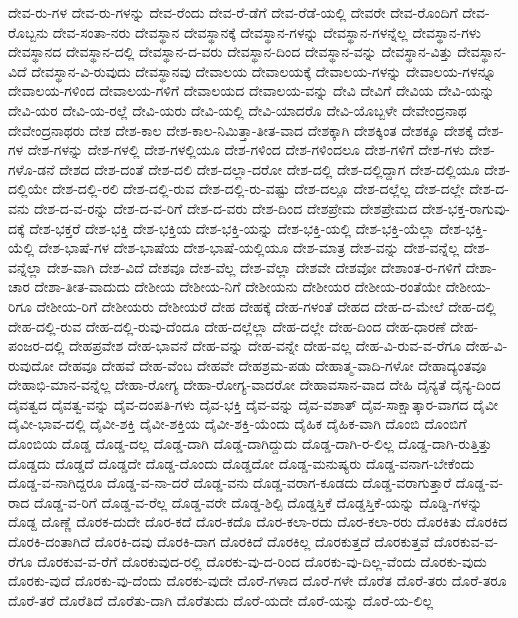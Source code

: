{ದೇವ-ರು-ಗಳ
ದೇವ-ರು-ಗಳನ್ನು
ದೇವ-ರೆಂದು
ದೇವ-ರೆ-ಡೆಗೆ
ದೇವ-ರೆಡೆ-ಯಲ್ಲಿ
ದೇವರೇ
ದೇವ-ರೊಂದಿಗೆ
ದೇವ-ರೊಬ್ಬನು
ದೇವ-ಸಂತಾ-ನರು
ದೇವಸ್ಥಾನ
ದೇವಸ್ಥಾನಕ್ಕೆ
ದೇವಸ್ಥಾನ-ಗಳನ್ನು
ದೇವಸ್ಥಾನ-ಗಳನ್ನೆಲ್ಲ
ದೇವಸ್ಥಾನ-ಗಳು
ದೇವಸ್ಥಾನದ
ದೇವಸ್ಥಾನ-ದಲ್ಲಿ
ದೇವಸ್ಥಾನ-ದ-ವರು
ದೇವಸ್ಥಾನ-ದಿಂದ
ದೇವಸ್ಥಾನ-ವನ್ನು
ದೇವಸ್ಥಾನ-ವಿತ್ತು
ದೇವಸ್ಥಾನ-ವಿದೆ
ದೇವಸ್ಥಾನ-ವಿ-ರುವುದು
ದೇವಸ್ಥಾನವು
ದೇವಾಲಯ
ದೇವಾಲಯಕ್ಕೆ
ದೇವಾಲಯ-ಗಳನ್ನು
ದೇವಾಲಯ-ಗಳನ್ನೂ
ದೇವಾಲಯ-ಗಳಿಂದ
ದೇವಾಲಯ-ಗಳಿಗೆ
ದೇವಾಲಯದ
ದೇವಾಲಯ-ವನ್ನು
ದೇವಿ
ದೇವಿಗೆ
ದೇವಿಯ
ದೇವಿ-ಯನ್ನು
ದೇವಿ-ಯರ
ದೇವಿ-ಯ-ರಲ್ಲೆ
ದೇವಿ-ಯರು
ದೇವಿ-ಯಲ್ಲಿ
ದೇವಿ-ಯಾದರೊ
ದೇವಿ-ಯೊಬ್ಬಳೇ
ದೇವೇಂದ್ರನಾಥ
ದೇವೇಂದ್ರನಾಥರು
ದೇಶ
ದೇಶ-ಕಾಲ
ದೇಶ-ಕಾಲ-ನಿಮಿತ್ತಾ-ತೀತ-ವಾದ
ದೇಶಕ್ಕಾಗಿ
ದೇಶಕ್ಕಿಂತ
ದೇಶಕ್ಕೂ
ದೇಶಕ್ಕೆ
ದೇಶ-ಗಳ
ದೇಶ-ಗಳನ್ನು
ದೇಶ-ಗಳಲ್ಲಿ
ದೇಶ-ಗಳಲ್ಲಿಯೂ
ದೇಶ-ಗಳಿಂದ
ದೇಶ-ಗಳಿಂದಲೂ
ದೇಶ-ಗಳಿಗೆ
ದೇಶ-ಗಳು
ದೇಶ-ಗಳೊ-ಡನೆ
ದೇಶದ
ದೇಶ-ದಂತೆ
ದೇಶ-ದಲಿ
ದೇಶ-ದಲ್ಲಾ-ದರೋ
ದೇಶ-ದಲ್ಲಿ
ದೇಶ-ದಲ್ಲಿದ್ದಾಗ
ದೇಶ-ದಲ್ಲಿಯೂ
ದೇಶ-ದಲ್ಲಿಯೇ
ದೇಶ-ದಲ್ಲಿ-ರಲಿ
ದೇಶ-ದಲ್ಲಿ-ರುವ
ದೇಶ-ದಲ್ಲಿ-ರು-ವಷ್ಟು
ದೇಶ-ದಲ್ಲೂ
ದೇಶ-ದಲ್ಲೆಲ್ಲ
ದೇಶ-ದಲ್ಲೇ
ದೇಶ-ದ-ವನು
ದೇಶ-ದ-ವ-ರನ್ನು
ದೇಶ-ದ-ವ-ರಿಗೆ
ದೇಶ-ದ-ವರು
ದೇಶ-ದಿಂದ
ದೇಶಪ್ರೇಮ
ದೇಶಪ್ರೇಮದ
ದೇಶ-ಭಕ್ತ-ರಾಗುವು-ದಕ್ಕೆ
ದೇಶ-ಭಕ್ತರೆ
ದೇಶ-ಭಕ್ತಿ
ದೇಶ-ಭಕ್ತಿಯ
ದೇಶ-ಭಕ್ತಿ-ಯನ್ನು
ದೇಶ-ಭಕ್ತಿ-ಯಲ್ಲಿ
ದೇಶ-ಭಕ್ತಿ-ಯೆಲ್ಲಾ
ದೇಶ-ಭಕ್ತಿ-ಯೆಲ್ಲಿ
ದೇಶ-ಭಾಷೆ-ಗಳ
ದೇಶ-ಭಾಷೆಯ
ದೇಶ-ಭಾಷೆ-ಯಲ್ಲಿಯೂ
ದೇಶ-ಮಾತ್ರ
ದೇಶ-ವನ್ನು
ದೇಶ-ವನ್ನೆಲ್ಲ
ದೇಶ-ವನ್ನೆಲ್ಲಾ
ದೇಶ-ವಾಗಿ
ದೇಶ-ವಿದೆ
ದೇಶವೂ
ದೇಶ-ವೆಲ್ಲ
ದೇಶ-ವೆಲ್ಲಾ
ದೇಶವೇ
ದೇಶವೋ
ದೇಶಾಂತ-ರ-ಗಳಿಗೆ
ದೇಶಾ-ಚಾರ
ದೇಶಾ-ತೀತ-ವಾದುದು
ದೇಶೀಯ
ದೇಶೀಯ-ನಿಗೆ
ದೇಶೀಯನು
ದೇಶೀಯರ
ದೇಶೀಯ-ರಂತೆಯೇ
ದೇಶೀಯ-ರಿಗೂ
ದೇಶೀಯ-ರಿಗೆ
ದೇಶೀಯರು
ದೇಶೀಯರೆ
ದೇಹ
ದೇಹಕ್ಕೆ
ದೇಹ-ಗಳಂತೆ
ದೇಹದ
ದೇಹ-ದ-ಮೇಲೆ
ದೇಹ-ದಲ್ಲಿ
ದೇಹ-ದಲ್ಲಿ-ರುವ
ದೇಹ-ದಲ್ಲಿ-ರುವು-ದೆಂದೂ
ದೇಹ-ದಲ್ಲೆಲ್ಲಾ
ದೇಹ-ದಲ್ಲೇ
ದೇಹ-ದಿಂದ
ದೇಹ-ಧಾರಣೆ
ದೇಹ-ಪಂಜರ-ದಲ್ಲಿ
ದೇಹಪ್ರವೇಶ
ದೇಹ-ಭಾವನೆ
ದೇಹ-ವನ್ನು
ದೇಹ-ವನ್ನೇ
ದೇಹ-ವಲ್ಲ
ದೇಹ-ವಿ-ರುವ-ವ-ರೆಗೂ
ದೇಹ-ವಿ-ರುವುದೋ
ದೇಹವೂ
ದೇಹವೆ
ದೇಹ-ವೆಂಬ
ದೇಹವೇ
ದೇಹಶ್ರಮ-ಪಡು
ದೇಹಾತ್ಮ-ವಾದಿ-ಗಳೋ
ದೇಹಾದ್ಯಂತವೂ
ದೇಹಾಭಿ-ಮಾನ-ವನ್ನೆಲ್ಲ
ದೇಹಾ-ರೋಗ್ಯ
ದೇಹಾ-ರೋಗ್ಯ-ವಾದರೋ
ದೇಹಾವಸಾನ-ವಾದ
ದೇಹಿ
ದೈನ್ಯತೆ
ದೈನ್ಯ-ದಿಂದ
ದೈವತ್ವದ
ದೈವತ್ವ-ವನ್ನು
ದೈವ-ದಂಪತಿ-ಗಳು
ದೈವ-ಭಕ್ತಿ
ದೈವ-ವನ್ನು
ದೈವ-ವಶಾತ್
ದೈವ-ಸಾಕ್ಷಾತ್ಕಾರ-ವಾಗದ
ದೈವೀ
ದೈವೀ-ಭಾವ-ದಲ್ಲಿ
ದೈವೀ-ಶಕ್ತಿ
ದೈವೀ-ಶಕ್ತಿಯ
ದೈವೀ-ಶಕ್ತಿ-ಯೆಂದು
ದೈಹಿಕ
ದೈಹಿಕ-ವಾಗಿ
ದೊಂಬಿ
ದೊಂಬಿಗೆ
ದೊಂಬಿಯ
ದೊಡ್ಡ
ದೊಡ್ಡ-ದಲ್ಲ
ದೊಡ್ಡ-ದಾಗಿ
ದೊಡ್ಡ-ದಾಗಿದ್ದುದು
ದೊಡ್ಡ-ದಾಗಿ-ರ-ಲಿಲ್ಲ
ದೊಡ್ಡ-ದಾಗಿ-ರುತ್ತಿತ್ತು
ದೊಡ್ಡದು
ದೊಡ್ಡದೆ
ದೊಡ್ಡದೇ
ದೊಡ್ಡ-ದೊಂದು
ದೊಡ್ಡದೋ
ದೊಡ್ಡ-ಮನುಷ್ಯರು
ದೊಡ್ಡ-ವನಾಗ-ಬೇಕೆಂದು
ದೊಡ್ಡ-ವ-ನಾಗಿದ್ದರೂ
ದೊಡ್ಡ-ವ-ನಾ-ದರೆ
ದೊಡ್ಡ-ವನು
ದೊಡ್ಡ-ವರಾಗ-ಕೂಡದು
ದೊಡ್ಡ-ವರಾಗುತ್ತಾರೆ
ದೊಡ್ಡ-ವ-ರಾದ
ದೊಡ್ಡ-ವ-ರಿಗೆ
ದೊಡ್ಡ-ವ-ರೆಲ್ಲ
ದೊಡ್ಡ-ವರೇ
ದೊಡ್ಡ-ಶಿಲ್ಪಿ
ದೊಡ್ಡಸ್ತಿಕೆ
ದೊಡ್ಡಸ್ತಿಕೆ-ಯನ್ನು
ದೊಡ್ಡಿ-ಗಳನ್ನು
ದೊಡ್ದ
ದೊಣ್ಣೆ
ದೊರಕ-ದುದೇ
ದೊರ-ಕದೆ
ದೊರ-ಕದೊ
ದೊರ-ಕಲಾ-ರದು
ದೊರ-ಕಲಾ-ರರು
ದೊರಕಿತು
ದೊರಕಿದ
ದೊರಕಿ-ದಂತಾಗಿದೆ
ದೊರಕಿ-ದವು
ದೊರಕಿ-ದಾಗ
ದೊರಕಿದೆ
ದೊರಕಿಲ್ಲ
ದೊರಕುತ್ತದೆ
ದೊರಕುತ್ತವೆ
ದೊರಕುವ-ವ-ರೆಗೂ
ದೊರಕುವ-ವ-ರೆಗೆ
ದೊರಕುವುದ-ರಲ್ಲಿ
ದೊರಕು-ವು-ದ-ರಿಂದ
ದೊರಕು-ವು-ದಿಲ್ಲ-ವೆಂದು
ದೊರಕು-ವುದು
ದೊರಕು-ವುದೆ
ದೊರಕು-ವು-ದೆಂದು
ದೊರಕು-ವುದೇ
ದೊರೆ-ಗಳಾದ
ದೊರೆ-ಗಳೇ
ದೊರೆತ
ದೊರೆ-ತರು
ದೊರೆ-ತರೂ
ದೊರೆ-ತರೆ
ದೊರೆತಿದೆ
ದೊರೆತು-ದಾಗಿ
ದೊರೆತುದು
ದೊರೆ-ಯದೇ
ದೊರೆ-ಯನ್ನು
ದೊರೆ-ಯ-ಲಿಲ್ಲ
}
